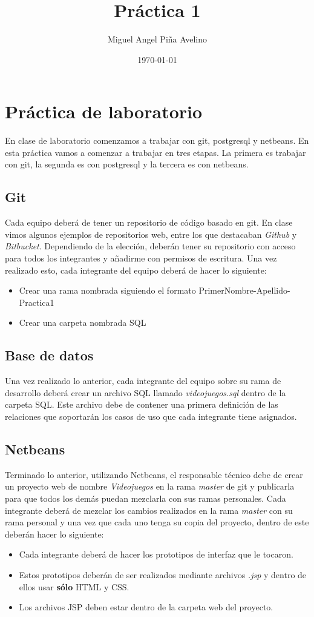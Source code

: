 \documentclass[11pt]{article}
\author{Miguel Angel Piña Avelino}
\date{\today}
\title{Práctica 1}
\begin{document}
\maketitle

\section*{Práctica de laboratorio}

En clase de laboratorio comenzamos a trabajar con git, postgresql y netbeans. En
esta práctica vamos a comenzar a trabajar en tres etapas. La primera es trabajar
con git, la segunda es con postgresql y la tercera es con netbeans.

\subsection*{Git}
Cada equipo deberá de tener un repositorio de código basado en git. En clase
vimos algunos ejemplos de repositorios web, entre los que destacaban \textit{Github}
y \textit{Bitbucket}. Dependiendo de la elección, deberán tener su repositorio
con acceso para todos los integrantes y añadirme con permisos de escritura.
Una vez realizado esto, cada integrante del equipo deberá de hacer lo siguiente:
\begin{itemize}
  \item Crear una rama nombrada siguiendo el formato {PrimerNombre}-{Apellido}-{Practica1}
  \item Crear una carpeta nombrada SQL
\end{itemize}

\subsection*{Base de datos}
Una vez realizado lo anterior, cada integrante del equipo sobre su rama de
desarrollo deberá crear un archivo SQL llamado \textit{videojuegos.sql} dentro
de la carpeta SQL.
Este archivo debe de contener una primera definición de las relaciones que soportarán
los casos de uso que cada integrante tiene asignados.
\subsection*{Netbeans}
Terminado lo anterior, utilizando Netbeans, el responsable técnico debe de crear
un proyecto web de nombre \textit{Videojuegos} en la rama \textit{master} de
git y publicarla para que todos los demás puedan mezclarla con sus ramas personales.
Cada integrante deberá de mezclar los cambios realizados en la rama \textit{master}
con su rama personal y una vez que cada uno tenga su copia del proyecto, dentro
de este deberán hacer lo siguiente:
\begin{itemize}
  \item Cada integrante deberá de hacer los prototipos de interfaz que le tocaron.
  \item Estos prototipos deberán de ser realizados mediante archivos \textit{.jsp}
        y dentro de ellos usar \textbf{sólo} HTML y CSS.
  \item Los archivos JSP deben estar dentro de la carpeta web del proyecto.
\end{itemize}
\end{document}
